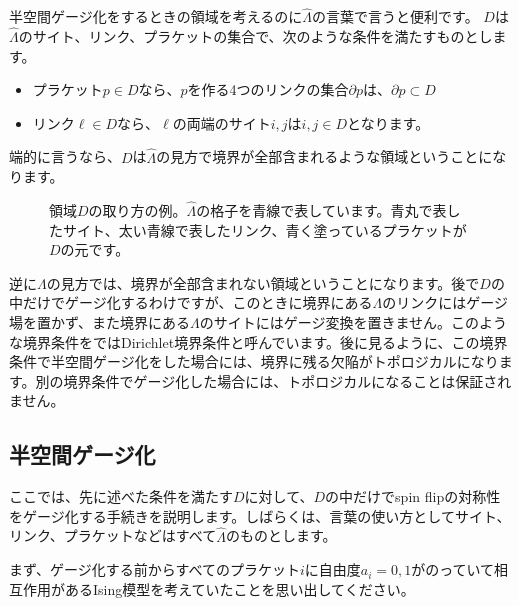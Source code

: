 \documentclass[report,paper=a4, fontsize=12pt, line_length=16cm, number_of_lines=33,dvipdfmx]{jlreq}
\numberwithin{equation}{chapter}
\newcommand{\del}{\partial}
\newcommand{\Lambdah}{\widehat{\Lambda}}
\begin{document}
半空間ゲージ化をするときの領域を考えるのに$\Lambdah$の言葉で言うと便利です。
$D$は$\Lambdah$のサイト、リンク、プラケットの集合で、次のような条件を満たすものとします。
\begin{itemize}
  \item プラケット$p\in D$なら、$p$を作る4つのリンクの集合$\del p$は、$\del p \subset D$
  \item リンク$\ell \in D$なら、$\ell$の両端のサイト$i,j$は$i,j\in D$となります。
\end{itemize}
端的に言うなら、$D$は$\Lambdah$の見方で境界が全部含まれるような領域ということになります。

\begin{figure}
  \centering
\caption{領域$D$の取り方の例。$\Lambdah$の格子を青線で表しています。青丸で表したサイト、太い青線で表したリンク、青く塗っているプラケットが$D$の元です。}
\end{figure}

逆に$\Lambda$の見方では、境界が全部含まれない領域ということになります。後で$D$の中だけでゲージ化するわけですが、このときに境界にある$\Lambda$のリンクにはゲージ場を置かず、また境界にある$\Lambda$のサイトにはゲージ変換を置きません。このような境界条件を\cite{Choi:2021kmx}ではDirichlet境界条件と呼んでいます。後に見るように、この境界条件で半空間ゲージ化をした場合には、境界に残る欠陥がトポロジカルになります。別の境界条件でゲージ化した場合には、トポロジカルになることは保証されません。

\subsection{半空間ゲージ化}
ここでは、先に述べた条件を満たす$D$に対して、$D$の中だけでspin flipの対称性をゲージ化する手続きを説明します。しばらくは、言葉の使い方としてサイト、リンク、プラケットなどはすべて$\Lambdah$のものとします。

まず、ゲージ化する前からすべてのプラケット$i$に自由度$a_i=0,1$がのっていて相互作用があるIsing模型を考えていたことを思い出してください。
\end{document}
